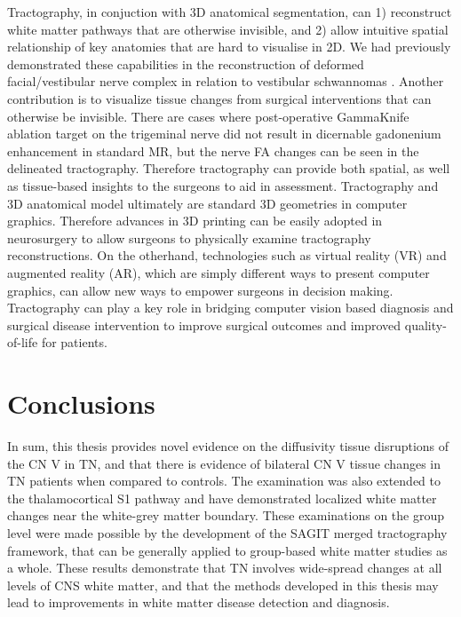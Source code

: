 Tractography, in conjuction with 3D anatomical segmentation, can 1) reconstruct white matter pathways that are otherwise invisible, and 2) allow intuitive spatial relationship of key anatomies that are hard to visualise in 2D. We had previously demonstrated these capabilities in the reconstruction of deformed facial/vestibular nerve complex in relation to vestibular schwannomas \cite{Chen2011b,Behan2017}.
Another contribution is to visualize tissue changes from surgical interventions that can otherwise be invisible. There are cases where post-operative GammaKnife ablation target on the trigeminal nerve did not result in dicernable gadonenium enhancement in standard MR, but the nerve FA changes can be seen in the delineated tractography. Therefore tractography can provide both spatial, as well as tissue-based insights to the surgeons to aid in assessment.
Tractography and 3D anatomical model ultimately are standard 3D geometries in computer graphics. Therefore advances in 3D printing can be easily adopted in neurosurgery to allow surgeons to physically examine tractography reconstructions. On the otherhand, technologies such as virtual reality (VR) and augmented reality (AR), which are simply different ways to present computer graphics, can allow new ways to empower surgeons in decision making. Tractography can play a key role in bridging computer vision based diagnosis and surgical disease intervention to improve surgical outcomes and improved quality-of-life for patients.    

\section{Conclusions}

In sum, this thesis provides novel evidence on the diffusivity tissue disruptions of the CN V in TN, and that there is evidence of bilateral CN V tissue changes in TN patients when compared to controls. The examination was also extended to the thalamocortical S1 pathway and have demonstrated localized white matter changes near the white-grey matter boundary. These examinations on the group level were made possible by the development of the SAGIT merged tractography framework, that can be generally applied to group-based white matter studies as a whole. These results demonstrate that TN involves wide-spread changes at all levels of CNS white matter, and that the methods developed in this thesis may lead to improvements in white matter disease detection and diagnosis.